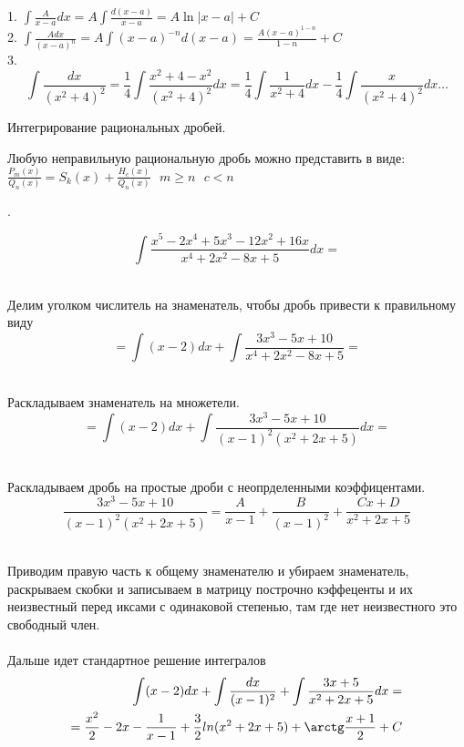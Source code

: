1. $\int \frac{A}{x-a}dx = A\int \frac{d(x-a)}{x-a} = A\ln|x-a| + C$\\
2. $\int \frac{Adx}{(x-a)^n} = A\int (x-a)^{-n}d(x-a)
  = \frac{A(x-a)^{1-n}}{1-n} + C$\\
3.
$$
\int \frac{dx}{(x^2+4)^2} = \frac{1}{4} \int \frac{x^2 + 4 - x^2}{(x^2 + 4)^2} dx = \frac{1}{4}\int \frac{1}{x^2 + 4} dx - \frac{1}{4} \int \frac{x}{(x^2+4)^2} dx \ldots
$$

\begin{title}[\Large]
  Интегрирование рациональных дробей.
\end{title}
Любую неправильную рациональную дробь можно представить в виде:\\
$\frac{P_m(x)}{Q_n(x)} = S_k(x) + \frac{H_c(x)}{Q_n(x)} ~~~ m \ge n ~~~ c < n$

\begin{center}
  .
\end{center}

\[\int \frac{x^5 - 2x^4 + 5x^3 - 12x^2 + 16x}{x^4 + 2x^2 - 8x + 5} dx = \]

\\
Делим уголком числитель на знаменатель, чтобы дробь привести к правильному виду
\[= \int (x - 2)dx + \int \frac{3x^3 - 5x + 10}{x^4 + 2x^2 - 8x + 5} = \]

\\
Раскладываем знаменатель на множетели.
\[= \int (x - 2)dx + \int \frac{3x^3 - 5x + 10}{(x-1)^2 (x^2+2x+5)} dx = \]

\\
Раскладываем дробь на простые дроби с неопрделенными коэффицентами.
\[
  \frac{3x^3 - 5x + 10}{(x-1)^2 (x^2+2x+5)} = \frac{A}{x - 1} +
  \frac{B}{(x - 1)^2} + \frac{Cx + D}{x^2 + 2x + 5}
\]

\\
Приводим правую часть к общему знаменателю и убираем знаменатель, раскрываем
скобки и записываем в матрицу построчно кэффеценты и их неизвестный перед
иксами с одинаковой степенью, там где нет неизвестного это свободный член.\\

\\
Дальше идет стандартное решение интегралов
\begin{eqnarray*}
  \int (x - 2)dx + \int \frac{dx}{(x - 1)^2} + \int \frac{3x + 5}{x^2 + 2x + 5}
    dx = \\
  =\frac{x^2}{2} - 2x - \frac{1}{x-1} + \frac{3}{2} ln(x^2 + 2x + 5) + \arctg
    \frac{x + 1}{2} + C
\end{eqnarray*}

